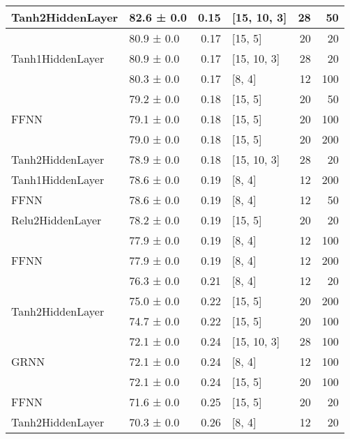 \begin{table*}[h]
\begin{tabular}{llrlrr}
 \hline
Tanh2HiddenLayer         & 82.6 ± 0.0 &  0.15 & [15, 10, 3]    &         28 &       50 \\
 \hline
\multirow{3}{*}{Tanh1HiddenLayer}         & 80.9 ± 0.0 &  0.17 & [15, 5]        &         20 &       20 \\
         & 80.9 ± 0.0 &  0.17 & [15, 10, 3]    &         28 &       20 \\
         & 80.3 ± 0.0 &  0.17 & [8, 4]         &         12 &      100 \\
 \hline
\multirow{3}{*}{FFNN}         & 79.2 ± 0.0 &  0.18 & [15, 5]        &         20 &       50 \\
         & 79.1 ± 0.0 &  0.18 & [15, 5]        &         20 &      100 \\
         & 79.0 ± 0.0 &  0.18 & [15, 5]        &         20 &      200 \\
 \hline
Tanh2HiddenLayer         & 78.9 ± 0.0 &  0.18 & [15, 10, 3]    &         28 &       20 \\
 \hline
Tanh1HiddenLayer         & 78.6 ± 0.0 &  0.19 & [8, 4]         &         12 &      200 \\
 \hline
FFNN         & 78.6 ± 0.0 &  0.19 & [8, 4]         &         12 &       50 \\
 \hline
Relu2HiddenLayer         & 78.2 ± 0.0 &  0.19 & [15, 5]        &         20 &       20 \\
 \hline
\multirow{3}{*}{FFNN}         & 77.9 ± 0.0 &  0.19 & [8, 4]         &         12 &      100 \\
         & 77.9 ± 0.0 &  0.19 & [8, 4]         &         12 &      200 \\
         & 76.3 ± 0.0 &  0.21 & [8, 4]         &         12 &       20 \\
 \hline
\multirow{2}{*}{Tanh2HiddenLayer}         & 75.0 ± 0.0 &  0.22 & [15, 5]        &         20 &      200 \\
         & 74.7 ± 0.0 &  0.22 & [15, 5]        &         20 &      100 \\
 \hline
\multirow{3}{*}{GRNN}         & 72.1 ± 0.0 &  0.24 & [15, 10, 3]    &         28 &      100 \\
         & 72.1 ± 0.0 &  0.24 & [8, 4]         &         12 &      100 \\
         & 72.1 ± 0.0 &  0.24 & [15, 5]        &         20 &      100 \\
 \hline
FFNN         & 71.6 ± 0.0 &  0.25 & [15, 5]        &         20 &       20 \\
 \hline
Tanh2HiddenLayer         & 70.3 ± 0.0 &  0.26 & [8, 4]         &         12 &       20 \\

\end{tabular}
\end{table*}
